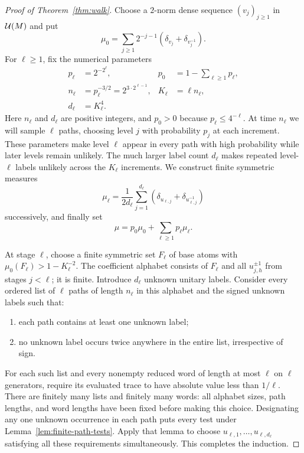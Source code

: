 \begin{proof}[Proof of Theorem~\ref{thm:walk}]
Choose a $2$-norm dense sequence $(v_j)_{j\geq1}$ in $\mathcal U(M)$ and put
\[
 \mu_0=\sum_{j\geq1}2^{-j-1}(\delta_{v_j}+\delta_{v_j^{-1}}).
\]
For $\ell\geq1$, fix the numerical parameters
\begin{align*}
 p_\ell&=2^{-2^\ell},
 &p_0&=1-\sum_{\ell\geq1}p_\ell,\\
 n_\ell&=p_\ell^{-3/2}=2^{3\cdot2^{\ell-1}},
 &K_\ell&=\ell n_\ell,\\
 d_\ell&=K_\ell^4.
\end{align*}
Here $n_\ell$ and $d_\ell$ are positive integers, and $p_0>0$ because
$p_\ell\leq4^{-\ell}$.  At time $n_\ell$ we will sample $\ell$ paths,
choosing level $j$ with probability $p_j$ at each increment.  These
parameters make level $\ell$ appear in every path with high probability
while later levels remain unlikely.  The much larger label count
$d_\ell$ makes repeated level-$\ell$ labels unlikely across the
$K_\ell$ increments.  We construct finite symmetric measures
\[
 \mu_\ell=\frac1{2d_\ell}
   \sum_{j=1}^{d_\ell}(\delta_{u_{\ell,j}}
                            +\delta_{u_{\ell,j}^{-1}})
\]
successively, and finally set
\[
 \mu=p_0\mu_0+\sum_{\ell\geq1}p_\ell\mu_\ell.
\]

At stage $\ell$, choose a finite symmetric set $F_\ell$ of base atoms
with $\mu_0(F_\ell)>1-K_\ell^{-2}$.  The coefficient alphabet consists
of $F_\ell$ and all $u_{j,h}^{\pm1}$ from stages $j<\ell$; it is
finite.  Introduce $d_\ell$ unknown unitary labels.  Consider every
ordered list of $\ell$ paths of length $n_\ell$ in this alphabet and
the signed unknown labels such that:
\begin{enumerate}
 \item each path contains at least one unknown label;
 \item no unknown label occurs twice anywhere in the entire list,
       irrespective of sign.
\end{enumerate}
For each such list and every nonempty reduced word of length at most
$\ell$ on $\ell$ generators, require its evaluated trace to have
absolute value less than $1/\ell$.  There are finitely many lists and
finitely many words: all alphabet sizes, path lengths, and word lengths
have been fixed before making this choice.  Designating any one unknown
occurrence in each path puts every test under
Lemma~\ref{lem:finite-path-tests}.  Apply that lemma to choose
$u_{\ell,1},\ldots,u_{\ell,d_\ell}$ satisfying all these requirements
simultaneously.  This completes the induction.


\end{proof}

